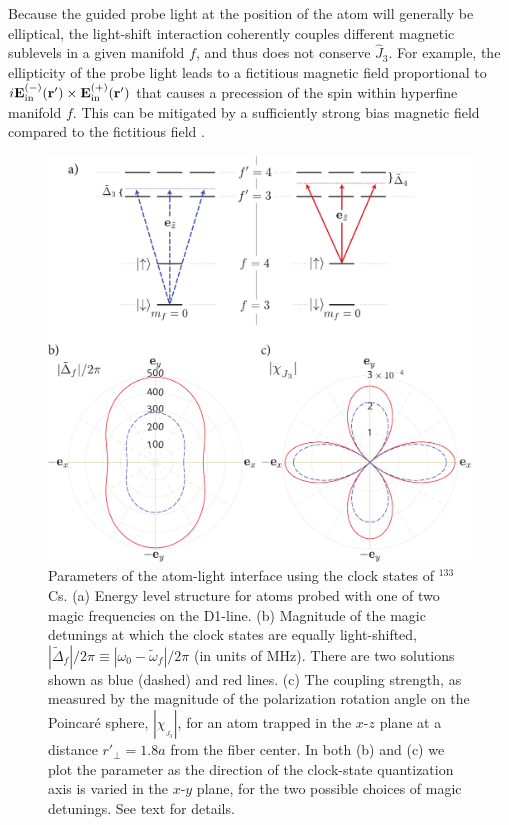 \documentclass[aps,pra,twocolumn]{revtex4-1} %
\newcommand{\inp}{{\rm in}}
\newcommand{\magic}[1]{\tilde{\omega}_{#1}}
\begin{document}
Because the guided probe light at the position of the atom will generally be elliptical, the light-shift interaction coherently couples different magnetic sublevels in a given manifold $f$, and thus does not conserve $\hat{J}_3$.  For example, the ellipticity of the probe light leads to a fictitious magnetic field proportional to $i \mathbf{E}^{(-)}_{\inp}(\br') \times \mathbf{E}^{(+)}_{\inp}(\br')$ that causes a precession of the spin within hyperfine manifold $f$.  This can be mitigated by a sufficiently strong bias magnetic field compared to the fictitious field \cite{smith_continuous_2004}. 


\begin{figure}
\includegraphics[scale=0.44]{./Fig3}
\caption{Parameters of the atom-light interface using the clock states of $^{133}$Cs.  
(a) Energy level structure for atoms probed with one of two magic frequencies on the D1-line. 
(b) Magnitude of the magic detunings at which the clock states are equally light-shifted, $| \tilde{\Delta}_{f}|/2\pi \equiv | \omega_0 - \magic{f} |/2\pi$ (in units of MHz). There are two solutions shown as blue (dashed) and red lines. (c) The coupling strength, as measured by the magnitude of the polarization rotation angle on the Poincar\'{e} sphere, $|\chi_{_{ J_3}}|$, for an atom trapped in the $x$-$z$ plane at a distance $ r'\!_\perp=1.8a $ from the fiber center.  In both (b) and (c) we plot the parameter as the direction of the clock-state quantization axis is varied in the $x$-$y$ plane, for the two possible choices of magic detunings.
See text for details.}\label{Fig::CouplingStrength}
\end{figure}
\end{document}
